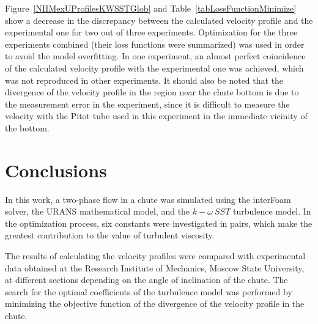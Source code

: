 \documentclass[mathematics,article,submit,pdftex,moreauthors]{Definitions/mdpi}
\begin{document}
Figure~\ref{NIIMexUProfilesKWSSTGlob} and Table~\ref{tabLossFunctionMinimize} show a decrease in the discrepancy between the calculated velocity profile and the experimental one for two out of three experiments. Optimization for the three experiments combined (their loss functions were summarized) was used in order to avoid the model overfitting. In one experiment, an almost perfect coincidence of the calculated velocity profile with the experimental one was achieved, which was not reproduced in other experiments. It should also be noted that the divergence of the velocity profile in the region near the chute bottom is due to the measurement error in the experiment, since it is difficult to measure the velocity with the Pitot tube used in this experiment in the immediate vicinity of the bottom.


\section{Conclusions}

In this work, a two-phase flow in a chute was simulated using the interFoam solver, the URANS mathematical model, and the $k-\omega\ SST$ turbulence model. In the optimization process, six constants were investigated in pairs, which make the greatest contribution to the value of turbulent viscosity.

The results of calculating the velocity profiles were compared with experimental data obtained at the Research Institute of Mechanics, Moscow State University, at different sections depending on the angle of inclination of the chute. The search for the optimal coefficients of the turbulence model was performed by minimizing the objective function of the divergence of the velocity profile in the chute. %
\end{document}
